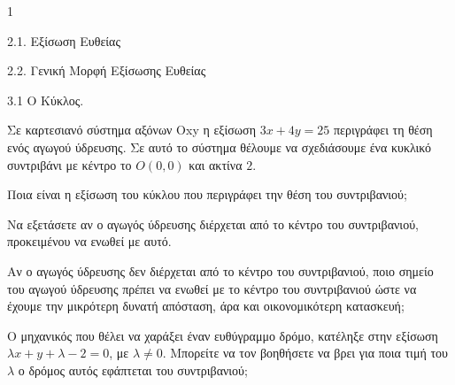 \begin{ylh}{1}
    \item 2.1. Εξίσωση Ευθείας
    \item 2.2. Γενική Μορφή Εξίσωσης Ευθείας
    \item 3.1 Ο Κύκλος.
\end{ylh}
Σε καρτεσιανό σύστημα αξόνων Oxy η εξίσωση $3x + 4y = 25$ περιγράφει τη θέση ενός αγωγού ύδρευσης. Σε αυτό το σύστημα θέλουμε να σχεδιάσουμε ένα κυκλικό συντριβάνι με κέντρο το $O(0,0)$ και ακτίνα $2$.

\begin{alist}
\item
    \begin{rlist}
    \item Ποια είναι η εξίσωση του κύκλου που περιγράφει την θέση του συντριβανιού; 
    \item Να εξετάσετε αν ο αγωγός ύδρευσης διέρχεται από το κέντρο του συντριβανιού, προκειμένου να ενωθεί με αυτό. 
    \item Αν ο αγωγός ύδρευσης δεν διέρχεται από το κέντρο του συντριβανιού, ποιο σημείο του αγωγού ύδρευσης πρέπει να ενωθεί με το κέντρο του συντριβανιού ώστε να έχουμε την μικρότερη δυνατή απόσταση, άρα και οικονομικότερη κατασκευή; 
    \end{rlist}
\item Ο μηχανικός που θέλει να χαράξει έναν ευθύγραμμο δρόμο, κατέληξε στην εξίσωση $\lambda x + y + \lambda - 2 = 0$, με $\lambda \neq 0$. Μπορείτε να τον βοηθήσετε να βρει για ποια τιμή του $\lambda$ ο δρόμος αυτός εφάπτεται του συντριβανιού; 
\end{alist}